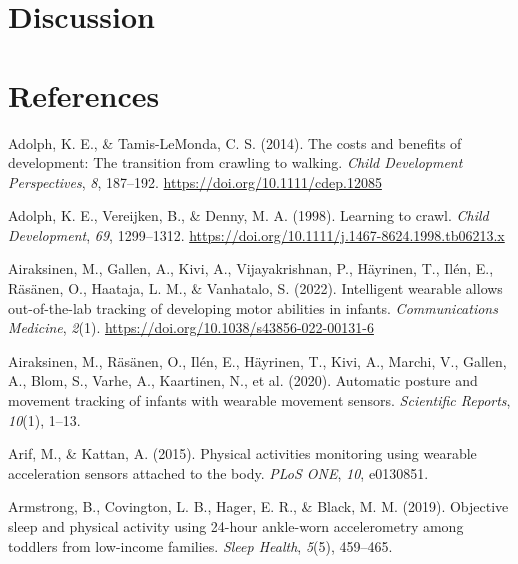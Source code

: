 \documentclass[
  man]{apa6}
\newlength{\cslhangindent}
\newlength{\cslentryspacingunit} %
\newenvironment{CSLReferences}[2] %
 {%
  \setlength{\parindent}{0pt}
  \ifodd #1
  \let\oldpar\par
  \def\par{\hangindent=\cslhangindent\oldpar}
  \fi
  \setlength{\parskip}{#2\cslentryspacingunit}
 }%
 {}
\begin{document}
\hypertarget{discussion}{%
\section{Discussion}\label{discussion}}

\newpage

\hypertarget{references}{%
\section{References}\label{references}}

\hypertarget{refs}{}
\begin{CSLReferences}{1}{0}
\leavevmode{}%
Adolph, K. E., \& Tamis-LeMonda, C. S. (2014). The costs and benefits of development: The transition from crawling to walking. \emph{Child Development Perspectives}, \emph{8}, 187--192. \url{https://doi.org/10.1111/cdep.12085}

\leavevmode{}%
Adolph, K. E., Vereijken, B., \& Denny, M. A. (1998). Learning to crawl. \emph{Child Development}, \emph{69}, 1299--1312. \url{https://doi.org/10.1111/j.1467-8624.1998.tb06213.x}

\leavevmode{}%
Airaksinen, M., Gallen, A., Kivi, A., Vijayakrishnan, P., Häyrinen, T., Ilén, E., Räsänen, O., Haataja, L. M., \& Vanhatalo, S. (2022). Intelligent wearable allows out-of-the-lab tracking of developing motor abilities in infants. \emph{Communications Medicine}, \emph{2}(1). \url{https://doi.org/10.1038/s43856-022-00131-6}

\leavevmode{}%
Airaksinen, M., Räsänen, O., Ilén, E., Häyrinen, T., Kivi, A., Marchi, V., Gallen, A., Blom, S., Varhe, A., Kaartinen, N., et al. (2020). Automatic posture and movement tracking of infants with wearable movement sensors. \emph{Scientific Reports}, \emph{10}(1), 1--13.

\leavevmode{}%
Arif, M., \& Kattan, A. (2015). Physical activities monitoring using wearable acceleration sensors attached to the body. \emph{{PLoS ONE}}, \emph{10}, e0130851.

\leavevmode{}%
Armstrong, B., Covington, L. B., Hager, E. R., \& Black, M. M. (2019). Objective sleep and physical activity using 24-hour ankle-worn accelerometry among toddlers from low-income families. \emph{Sleep Health}, \emph{5}(5), 459--465.


\end{CSLReferences}
\end{document}
